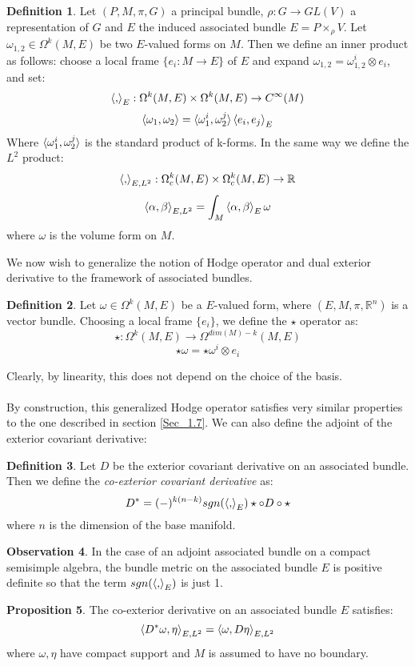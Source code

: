 \documentclass[12pt,a4paper]{report}
\theoremstyle{definition}
\newtheorem{Def}{Definition}[chapter]
\theoremstyle{Theorem}
\newtheorem{Prop}[Def]{Proposition}
\theoremstyle{definition}
\theoremstyle{definition}
\newtheorem{Obs}[Def]{Observation}
\begin{document}
	\begin{Def}
		Let $(P,M,\pi,G)$ a principal bundle, $\rho:G\rightarrow GL(V)$ a representation of $G$ and $E$ the induced associated bundle $E=P\times_\rho V$. Let $\omega_{1,2}\in \Omega^k(M,E)$ be two $E$-valued forms on $M$. Then we define an inner product as follows: choose a local frame $\{e_i:M\rightarrow E\}$ of $E$ and expand $\omega_{1,2}=\omega_{1,2}^i\otimes e_i$, and set:
		$$\braket{,}_{E}:\Omega^k(M,E)\times \Omega^k(M,E)\rightarrow C^\infty(M)$$
		$$\braket{\omega_1,\omega_2}=\braket{\omega_1^i,\omega_2^j}\braket{e_i,e_j}_E$$
		Where $\braket{\omega_1^i,\omega_2^j}$ is the standard product of k-forms.
		In the same way we define the $L^2$ product:
		$$\braket{,}_{E,L^2}:\Omega^k_c(M,E)\times\Omega^k_c(M,E)\rightarrow \mathbb{R}$$
		$$\braket{\alpha,\beta}_{E,L^2}=\int_M\braket{\alpha,\beta}_E\omega$$
		where $\omega$ is the volume form on $M$.
	\end{Def}
	We now wish to generalize the notion of Hodge operator and dual exterior derivative to the framework of associated bundles.
	\begin{Def}
		Let $\omega\in\Omega^k(M,E)$ be a $E$-valued form, where $(E,M,\pi,\mathbb{R}^n)$ is a vector bundle. Choosing a local frame $\{e_i\}$, we define the $\star$ operator as:
		$$\star:\Omega^k(M,E)\rightarrow \Omega^{dim(M)-k}(M,E)$$
		$$\star\omega=\star\omega^i\otimes e_i$$ 
	\end{Def}
	Clearly, by linearity, this does not depend on the choice of the basis.\\
	\\
	By construction, this generalized Hodge operator satisfies very similar properties to the one described in section \ref{Sec_1.7}. We can also define the adjoint of the exterior covariant derivative:
	\begin{Def}
		Let $D$ be the exterior covariant derivative on an associated bundle. Then we define the \textit{co-exterior covariant derivative} as:
		$$D^*=(-)^{k(n-k)}sgn(\braket{,}_E)\star\circ D\circ\star$$
		where $n$ is the dimension of the base manifold.
	\end{Def}
	\begin{Obs}
		In the case of an adjoint associated bundle on a compact semisimple algebra, the bundle metric on the associated bundle $E$ is positive definite so that the term $sgn(\braket{,}_E)$ is just 1.
	\end{Obs}
	\begin{Prop}\label{Prop_7.3.2}
		The co-exterior derivative on an associated bundle $E$ satisfies:
		$$\braket{D^*\omega,\eta}_{E,L^2}=\braket{\omega,D\eta}_{E,L^2}$$
		where $\omega,\eta$ have compact support and $M$ is assumed to have no boundary.
	\end{Prop}
\end{document}
